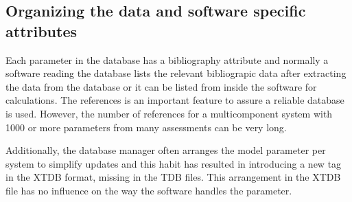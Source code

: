 \documentclass{article}
\begin{document}
\subsection{Organizing the data and software specific attributes}\label{sec:subsys}\label{sec:soft}\label{sec:last}

Each parameter in the database has a bibliography attribute and
normally a software reading the database lists the relevant
bibliograpic data after extracting the data from the database or it
can be listed from inside the software for calculations.  The
references is an important feature to assure a reliable database is
used.  However, the number of references for a multicomponent system
with 1000 or more parameters from many assessments can be very long.

Additionally, the database manager often arranges the model parameter
per system to simplify updates and this habit has resulted in
introducing a new tag in the XTDB format, missing in the TDB files.
This arrangement in the XTDB file has no influence on the way the
software handles the parameter.
\end{document}
